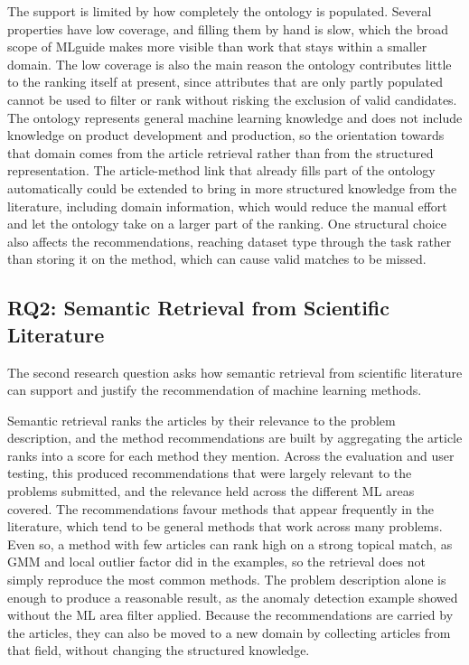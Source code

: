 The support is limited by how completely the ontology is populated. 
Several properties have low coverage, and filling them by hand is 
slow, which the broad scope of MLguide makes more visible than work 
that stays within a smaller domain. The low coverage is also the main 
reason the ontology contributes little to the ranking itself at 
present, since attributes that are only partly populated cannot be 
used to filter or rank without risking the exclusion of valid 
candidates. The ontology represents general machine learning knowledge and does not 
include knowledge on product development and 
production, so the orientation towards that domain comes from the 
article retrieval rather than from the structured representation. The 
article-method link that already fills part of the ontology 
automatically could be extended to bring in more structured knowledge 
from the literature, including domain information, which would reduce 
the manual effort and let the ontology take on a larger part of the 
ranking. One structural choice also affects the recommendations, 
reaching dataset type through the task rather than storing it on the 
method, which can cause valid matches to be missed.

\subsection{RQ2: Semantic Retrieval from Scientific Literature}

The second research question asks how semantic retrieval from 
scientific literature can support and justify the recommendation 
of machine learning methods.

Semantic retrieval ranks the articles by their relevance to the 
problem description, and the method recommendations are built by 
aggregating the article ranks into a score for each method they 
mention. Across the evaluation and user testing, this produced
recommendations that were largely relevant to the problems
submitted, and the relevance held across the different ML areas
covered. The recommendations favour methods that appear frequently in the
literature, which tend to be general methods that work across many
problems. Even so, a method with few articles can rank high on a
strong topical match, as GMM and local outlier factor did in the
examples, so the retrieval does not simply reproduce the most common
methods.
The problem description alone is enough to produce a reasonable 
result, as the anomaly detection example showed without the ML area 
filter applied. Because the recommendations 
are carried by the articles, they can also be moved to a new 
domain by collecting articles from that field, without changing 
the structured knowledge.

